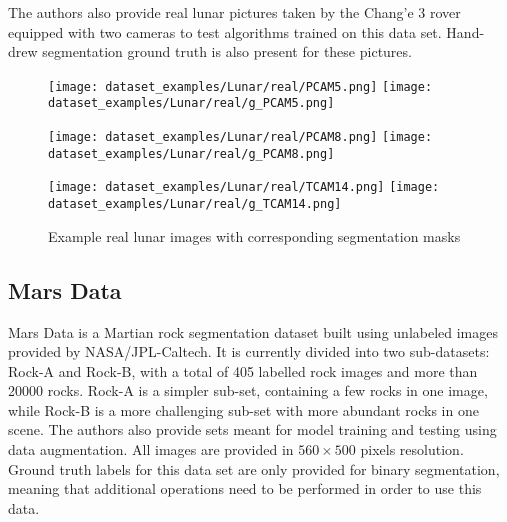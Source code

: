 \documentclass[a4paper,twoside,12pt]{book}
\begin{document}
The authors also provide real lunar pictures taken by the Chang'e 3 rover equipped with two cameras to test algorithms trained on this data set. Hand-drew segmentation ground truth is also present for these pictures.

\begin{figure}[!h]
    \centering
    \texttt{[image: dataset\_examples/Lunar/real/PCAM5.png]}
    \texttt{[image: dataset\_examples/Lunar/real/g\_PCAM5.png]}

    \texttt{[image: dataset\_examples/Lunar/real/PCAM8.png]}
    \texttt{[image: dataset\_examples/Lunar/real/g\_PCAM8.png]}

    \texttt{[image: dataset\_examples/Lunar/real/TCAM14.png]}
    \texttt{[image: dataset\_examples/Lunar/real/g\_TCAM14.png]}
    \caption{Example real lunar images with corresponding segmentation masks}
    \label{fig:data_real_example1}
\end{figure}

\subsection{Mars Data}
Mars Data \cite{xiao2021kernel} is a Martian rock segmentation dataset built using unlabeled images provided by NASA/JPL-Caltech. It is currently divided into two sub-datasets: Rock-A and Rock-B, with a total of 405 labelled rock images and more than 20000 rocks. Rock-A is a simpler sub-set, containing a few rocks in one image, while Rock-B is a more challenging sub-set with more abundant rocks in one scene. The authors also provide sets meant for model training and testing using data augmentation. All images are provided in $560 \times 500$ pixels resolution. Ground truth labels for this data set are only provided for binary segmentation, meaning that additional operations need to be performed in order to use this data.
\end{document}
